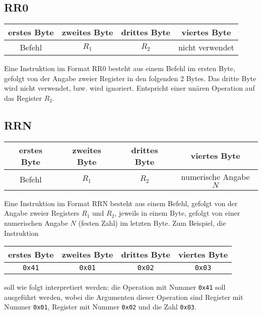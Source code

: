 \subsection{RR0}
\label{RR0}

\begin{center}
  \begin{tabular}{|*{4}{c|}} \hline
    erstes Byte  & zweites Byte  & drittes Byte  & viertes Byte \\\hline\hline
    Befehl       & $R_{1}$       & $R_{2}$ &  nicht verwendet   \\\hline
  \end{tabular}
\end{center}
Eine Instruktion im Format RR0 besteht aus einem Befehl im ersten Byte, gefolgt
von der Angabe zweier Register in den folgenden 2 Bytes.
Das dritte Byte wird nicht verwendet, bzw. wird ignoriert.
Entspricht einer unären Operation auf das Register $R_{2}$.


\subsection{RRN}
\label{RRN}

\begin{center}
  \begin{tabular}{|*{4}{c|}} \hline
    erstes Byte  & zweites Byte  & drittes Byte  & viertes Byte \\\hline\hline
    Befehl       & $R_{1}$       & $R_{2}$ & numerische Angabe $N$  \\\hline
  \end{tabular}
\end{center}
Eine Instruktion im Format RRN besteht aus einem Befehl, gefolgt von der
Angabe zweier Registers $R_{1}$ und $R_{2}$, jeweils in einem Byte, gefolgt von
einer numerischen Angabe $N$ (festen Zahl) im letzten Byte. Zum Beispiel, die
Instruktion
\begin{center}
  \begin{tabular}{|*{4}{c|}} \hline
    erstes Byte & zweites Byte  & drittes Byte  & viertes Byte \\\hline\hline
    \texttt{0x41} & \texttt{0x01} & \texttt{0x02} & \texttt{0x03} \\\hline
  \end{tabular}
\end{center}
soll wie folgt interpretiert werden: 
die Operation mit Nummer \texttt{0x41} soll ausgeführt werden, wobei die
Argumenten dieser Operation sind Register mit Nummer \texttt{0x01}, Register mit
Nummer \texttt{0x02} und die Zahl \texttt{0x03}.



